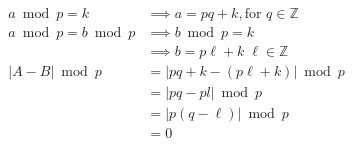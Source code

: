 \documentclass[preview]{standalone}
\begin{document}
\begin{align*}
\
            a \bmod p = k &\implies a = pq + k, \text{for } q \in \mathbb{Z} \\ \
                a\bmod p = b \bmod p &\implies b \bmod p = k\\ \
                &\implies b = p\ell + k \; \ell \in \mathbb{Z} \\ \
                |A - B| \bmod p &= |pq + k - (p\ell + k)| \bmod p \\ \
                &= |pq - pl| \bmod p \\ \
                &= |p(q - \ell)| \bmod p \\ \
                &\boxed{=0} \\ \
\end{align*}
\end{document}
